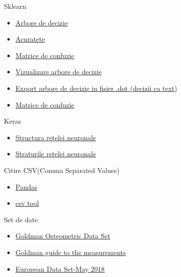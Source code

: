 \documentclass[runningheads,a4paper,11pt]{report}
\begin{document}
Sklearn
\begin{itemize}
    \item \href{https://scikit-learn.org/stable/modules/generated/sklearn.tree.DecisionTreeClassifier.html}{Arbore de decizie}
    \item \href{https://scikit-learn.org/stable/modules/generated/sklearn.metrics.accuracy_score.html}{Acuratete}
    \item \href{https://scikit-learn.org/stable/modules/generated/sklearn.metrics.confusion_matrix.html}{Matrice de confuzie}
    \item \href{https://scikit-learn.org/stable/modules/generated/sklearn.tree.export_graphviz.html}{Vizualizare arbore de decizie}
    \item \href{https://scikit-learn.org/stable/modules/generated/sklearn.tree.export_text.html}{Export arbore de decizie in fisier .dot (decizii ca text)}
    \item \href{https://scikit-learn.org/stable/modules/generated/sklearn.metrics.ConfusionMatrixDisplay.html#sklearn.metrics.ConfusionMatrixDisplay.from_predictions}{Matrice de confuzie}
\end{itemize}

\noindent Keras
\begin{itemize}
    \item \href{https://keras.io/api/models/sequential/}{Structura retelei neuronale}
    \item \href{https://keras.io/api/layers/}{Straturile retelei neuronale}
\end{itemize}

\noindent Citire CSV(Comma Separated Values)
\begin{itemize}
    \item \href{https://pandas.pydata.org/pandas-docs/stable/reference/api/pandas.read_csv.html}{Pandas}
    \item \href{https://docs.python.org/3/library/csv.html}{csv tool}
\end{itemize}

\noindent Set de date
\begin{itemize}
    \item \href{https://web.utk.edu/~auerbach/GOLD.htm}{Goldman Osteometric Data Set}
    \item \href{https://web.utk.edu/~auerbach/GoldMeasures.pdf}{Goldman guide to the measurements}
    \item \href{https://fae.johnshopkins.edu/}{European Data Set-May 2018}
\end{itemize}
\end{document}
